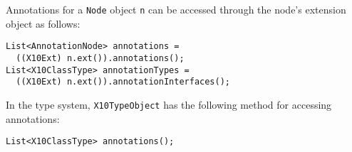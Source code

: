 Annotations for a \texttt{Node} object \texttt{n} can be accessed through the
node's extension object as follows:

\begin{verbatim}
List<AnnotationNode> annotations =
  ((X10Ext) n.ext()).annotations();
List<X10ClassType> annotationTypes =
  ((X10Ext) n.ext()).annotationInterfaces();
\end{verbatim}
In the type system, \texttt{X10TypeObject} has the following
method for accessing annotations:
\begin{verbatim}
List<X10ClassType> annotations();
\end{verbatim}






